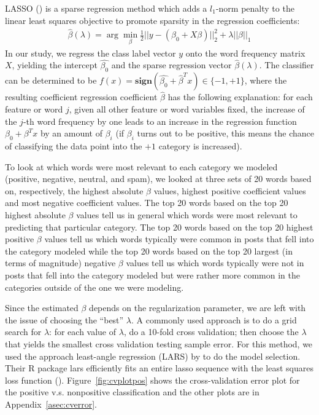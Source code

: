 \documentclass[11pt]{article}
\newcommand{\1}[1]{{\mathbf 1}\left\{#1\right\}}        %
\begin{document}
LASSO (\cite{tibshirani1996regression}) is a sparse regression method which adds a $l_1$-norm penalty to the linear least squares objective to promote sparsity in the regression coefficients:
\begin{align}
\label{eq:Lasso}
\hat{\beta}(\lambda) = \arg \min_\beta \frac{1}{2}||y-(\beta_0+X\beta)||_2^2 + \lambda ||\beta||_1
\end{align}
In our study, we regress the class label vector $y$ onto the word frequency matrix $X$, yielding the intercept $\hat{\beta_0}$ and the sparse regression vector $\hat{\beta}(\lambda)$. The classifier can be determined to be $f(x) = \textbf{sign}(\hat{\beta_0}+\hat{\beta}^Tx)\in\{-1,+1\}$, where the resulting coefficient regression coefficient $\hat{\beta}$ has the following explanation: for each feature or word $j$, given all other feature or word variables fixed, the increase of the $j$-th word frequency by one leads to an increase in the regression function $\beta_0+\beta^Tx$ by an amount of $\beta_i$ (if $\beta_i$ turns out to be positive, this means the chance of classifying the data point into the $+1$ category is increased).

To look at which words were most relevant to each category we modeled (positive, negative, neutral, and spam), we looked at three sets of 20 words based on, respectively, the highest absolute $\beta$ values, highest positive coefficient values and most negative coefficient values. The top 20 words based on the top 20 highest absolute $\beta$ values tell us in general which words were most relevant to predicting that particular category.  The top 20 words based on the top 20 highest positive $\beta$ values tell us which words typically were common in posts that fell into the category modeled while the top 20 words based on the top 20 largest (in terms of magnitude) negative $\beta$ values tell us which words typically were not in posts that fell into the category modeled but were rather more common in the categories outside of the one we were modeling.

Since the estimated $\beta$ depends on the regularization parameter, we are left with the issue of choosing the ``best'' $\lambda$. A commonly used approach is to do a grid search for $\lambda$: for each value of $\lambda$, do a 10-fold cross validation; then choose the $\lambda$ that yields the smallest cross validation testing sample error. For this method, we used the approach least-angle regression (LARS) by \cite{efron2004least} to do the model selection. Their {\sffamily R} package {\sffamily lars} efficiently fits an entire lasso sequence with the least squares loss function (\cite{Rlars}). Figure~\ref{fig:cvplotpos} shows the cross-validation error plot for the positive v.s. nonpositive classification and the other plots are in Appendix~\ref{asec:cverror}.
\end{document}
